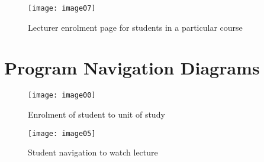 \documentclass{article}
\begin{document}
\begin{figure}[h!]
\centering
\texttt{[image: image07]}
\caption{Lecturer enrolment page for students in a particular course}
\end{figure}

\clearpage
\section{Program Navigation Diagrams}
\begin{figure}[h!]
\centering
\texttt{[image: image00]}
\caption{Enrolment of student to unit of study}
\end{figure}

\begin{figure}[h!]
\centering
\texttt{[image: image05]}
\caption{Student navigation to watch lecture}
\end{figure}

\clearpage
\end{document}
